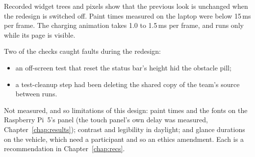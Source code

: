 Recorded widget trees and pixels show that the previous look is unchanged when the redesign is switched off. Paint times measured on the laptop were below 15\,ms per frame. The charging animation takes 1.0 to 1.5\,ms per frame, and runs only while its page is visible.

Two of the checks caught faults during the redesign:
\begin{itemize}
\item an off-screen test that reset the status bar's height hid the obstacle pill;
\item a test-cleanup step had been deleting the shared copy of the team's source between runs.
\end{itemize}

Not measured, and so limitations of this design: paint times and the fonts on the Raspberry Pi~5's panel (the touch panel's own delay was measured, Chapter~\ref{chap:results}); contrast and legibility in daylight; and glance durations on the vehicle, which need a participant and so an ethics amendment. Each is a recommendation in Chapter~\ref{chap:recs}.
